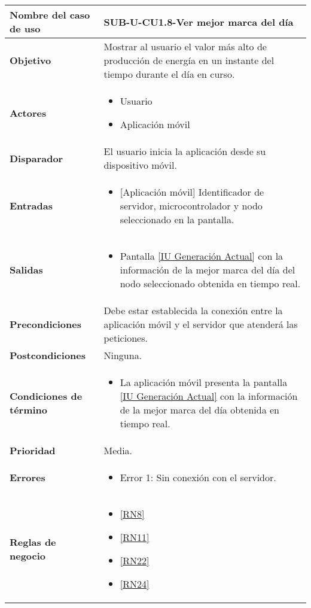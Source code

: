 \begin{longtable}{|J{5cm}|J{10.3cm}|}
	\hline
	\textbf{Nombre del caso de uso} &
		SUB-U-CU1.8-Ver mejor marca del día \\ \hline
	\textbf{Objetivo} &
		Mostrar al usuario el valor más alto de producción de energía en un instante del tiempo durante el día en curso. \\ \hline
	\textbf{Actores} &
		\begin{itemize}
		    \item Usuario
			\item Aplicación móvil
		\end{itemize} \\ \hline
	\textbf{Disparador} & 
	    El usuario inicia la aplicación desde su dispositivo móvil.\\ \hline 
	\textbf{Entradas} & 
		\begin{itemize}
				\item{[Aplicación móvil]} Identificador de servidor, microcontrolador y nodo seleccionado en la pantalla.
		\end{itemize}\\ \hline 
	\textbf{Salidas} & 
		\begin{itemize}
			\item Pantalla \hyperref[fig:monitoreoReal]{[IU Generación Actual]} con la información de la mejor marca del día del nodo seleccionado obtenida en tiempo real.
		\end{itemize} \\ \hline
	\textbf{Precondiciones} &
		Debe estar establecida la conexión entre la aplicación móvil y el servidor que atenderá las peticiones. \\ \hline
	\textbf{Postcondiciones} &
		Ninguna.\\ \hline
	\textbf{Condiciones de término} & 
		\begin{itemize}
			\item La aplicación móvil presenta la pantalla \hyperref[fig:monitoreoReal]{[IU Generación Actual]} con la información de la mejor marca del día obtenida en tiempo real.
		\end{itemize} \\ \hline 
	\textbf{Prioridad} & 
		Media. \\ \hline
	\textbf{Errores} & 
		\begin{itemize}
		    \item \label{CUU1.1:Error1} Error 1: Sin conexión con el servidor.
		\end{itemize} \\ \hline
	\textbf{Reglas de negocio} & 
		\begin{itemize}
		    \item \ref{RN8}
			\item \ref{RN11}
			\item \ref{RN22}
			\item \ref{RN24}
		\end{itemize} \\ \hline
\end{longtable}

